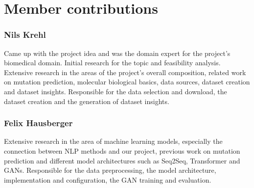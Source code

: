 \section*{Member contributions}

\subsubsection*{Nils Krehl}

Came up with the project idea and was the domain expert for the project's biomedical domain. Initial research for the topic and feasibility analysis. Extensive research in the areas of the project's overall composition, related work on mutation prediction, molecular biological basics, data sources, dataset creation and dataset insights. Responsible for the data selection and download, the dataset creation and the generation of dataset insights.

\subsubsection*{Felix Hausberger}

Extensive research in the area of machine learning models, especially the connection between \ac{NLP} methods and our project, previous work on mutation prediction and different model ar\-chi\-tec\-tu\-res such as \ac{Seq2Seq}, Transformer and \acp{GAN}.
Responsible for the data preprocessing, the model ar\-chi\-tec\-tu\-re, implementation and configuration, the GAN training and evaluation.